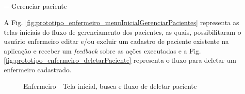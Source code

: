 \subparagraph*{} $-$ Gerenciar paciente

A Fig. \ref{fig:prototipo_enfermeiro_menuInicialGerenciarPacientes} representa as telas iniciais do fluxo de gerenciamento dos pacientes, as quais, possibilitaram o usuário enfermeiro editar e/ou excluir um cadastro de paciente existente na aplicação e receber um \textit{feedback} sobre as ações executadas e a Fig. \ref{fig:prototipo_enfermeiro_deletarPaciente} representa o fluxo para deletar um enfermeiro cadastrado.

\begin{figure}[H]
    \centering
    \caption{Enfermeiro - Tela inicial, busca e fluxo de deletar paciente}
\end{figure}

